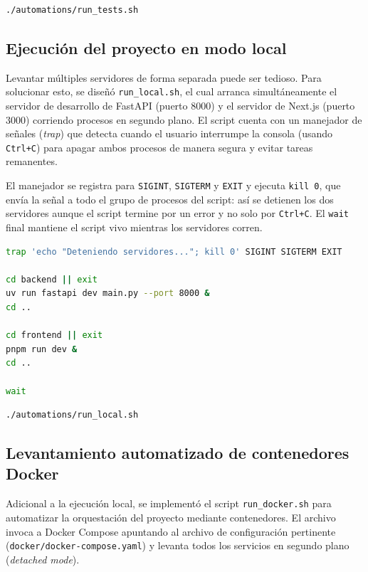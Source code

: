 \begin{lstlisting}[language=bash, caption={Comando para ejecutar todas las pruebas}]
./automations/run_tests.sh
\end{lstlisting}

\subsection{Ejecución del proyecto en modo local}
Levantar múltiples servidores de forma separada puede ser tedioso. Para solucionar esto, se diseñó \texttt{run\_local.sh}, el cual arranca simultáneamente el servidor de desarrollo de FastAPI (puerto 8000) y el servidor de Next.js (puerto 3000) corriendo procesos en segundo plano. El script cuenta con un manejador de señales (\textit{trap}) que detecta cuando el usuario interrumpe la consola (usando \texttt{Ctrl+C}) para apagar ambos procesos de manera segura y evitar tareas remanentes.

El manejador se registra para \texttt{SIGINT}, \texttt{SIGTERM} y \texttt{EXIT} y ejecuta \texttt{kill 0}, que envía la señal a todo el grupo de procesos del script: así se detienen los dos servidores aunque el script termine por un error y no solo por \texttt{Ctrl+C}. El \texttt{wait} final mantiene el script vivo mientras los servidores corren.

\begin{lstlisting}[language=bash, caption={Manejo de señales en \texttt{run\_local.sh}}]
trap 'echo "Deteniendo servidores..."; kill 0' SIGINT SIGTERM EXIT

cd backend || exit
uv run fastapi dev main.py --port 8000 &
cd ..

cd frontend || exit
pnpm run dev &
cd ..

wait
\end{lstlisting}

\begin{lstlisting}[language=bash, caption={Comando para levantar los servidores en local}]
./automations/run_local.sh
\end{lstlisting}

\subsection{Levantamiento automatizado de contenedores Docker}
Adicional a la ejecución local, se implementó el script \texttt{run\_docker.sh} para automatizar la orquestación del proyecto mediante contenedores. El archivo invoca a Docker Compose apuntando al archivo de configuración pertinente (\texttt{docker/docker-compose.yaml}) y levanta todos los servicios en segundo plano (\textit{detached mode}).

